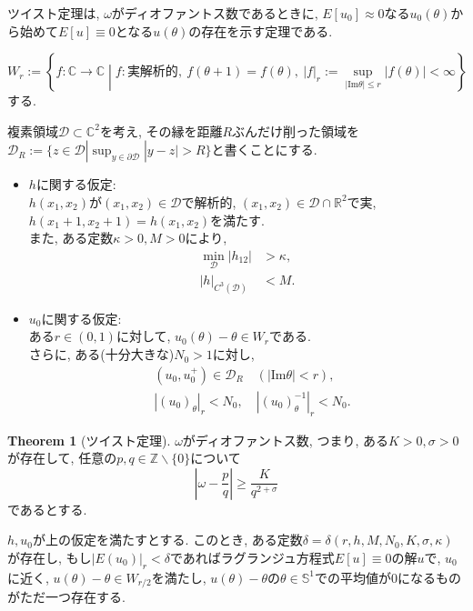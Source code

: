\documentclass[a4paper]{ujarticle}
\numberwithin{equation}{section}
\theoremstyle{definition}
\newtheorem{theorem}{Theorem}
\begin{document}
        ツイスト定理は, $\omega$がディオファントス数であるときに,
        $E[u_0] \approx 0$なる$u_0(\theta)$から始めて$E[u] \equiv 0$となる$u(\theta)$の存在を示す定理である.
        
        \[
            W_r := \left\{f: \mathbb{C} \rightarrow \mathbb{C} \middle| f : \text{実解析的}, \ f(\theta + 1) = f(\theta), \ |f|_r := \sup_{|\mathrm{Im} \theta| \leq r} |f(\theta)| < \infty \right\}
        \]
        する.

        複素領域$\mathcal{D} \subset \mathbb{C}^2$を考え, その縁を距離$R$ぶんだけ削った領域を$\mathcal{D}_{R} := \{z \in \mathcal{D} | \sup_{y \in \mathcal{\partial D}}|y - z| > R\}$と書くことにする.
        \begin{itemize}
            \item $h$に関する仮定: \\
            $h(x_1, x_2)$が$(x_1, x_2) \in \mathcal{D}$で解析的, $(x_1, x_2) \in \mathcal{D} \cap \mathbb{R}^2$で実, 
            $h(x_1 + 1, x_2 + 1) = h(x_1, x_2)$を満たす. \\
            また, ある定数$\kappa > 0, M > 0$により, 
            \begin{align}
                \min_{\mathcal{D}} |h_{12}| &> \kappa, \label{eq:5} \\
                |h|_{C^3(\mathcal{D})} &< M. \label{eq:6}
            \end{align}
            \item $u_0$に関する仮定: \\
            ある$r \in (0, 1)$に対して, $u_0(\theta) - \theta \in W_r$である. \\
            さらに, ある(十分大きな)$N_0 > 1$に対し, 
            \begin{align}
                &(u_0, u^{+}_0) \in \mathcal{D}_{R} \quad (|\mathrm{Im} \theta| < r) \label{eq:7}, \\
                &|(u_0)_{\theta}|_r < N_0, \quad |(u_0)^{-1}_{\theta}|_r < N_0. \label{eq:8}
            \end{align}
        \end{itemize}

        \begin{theorem}[ツイスト定理] \label{thm:twi}
            $\omega$がディオファントス数, つまり, ある$K > 0, \sigma > 0$が存在して, 
            任意の$p, q \in \mathbb{Z} \backslash \{0\}$について
            \begin{equation} \label{eq:9}
                |\omega - \frac{p}{q}| \geq \frac{K}{q^{2 + \sigma}}
            \end{equation}
            であるとする.

            $h, u_0$が上の仮定を満たすとする. このとき, ある定数$\delta = \delta(r, h, M, N_0, K, \sigma, \kappa)$が存在し,
            もし$|E(u_0)|_r < \delta$であればラグランジュ方程式$E[u] \equiv 0$の解$u$で, $u_0$に近く, $u(\theta) - \theta \in W_{r/2}$を満たし, 
            $u(\theta) - \theta$の$\theta \in \mathbb{S}^1$での平均値が$0$になるものがただ一つ存在する.
        \end{theorem}
\end{document}
